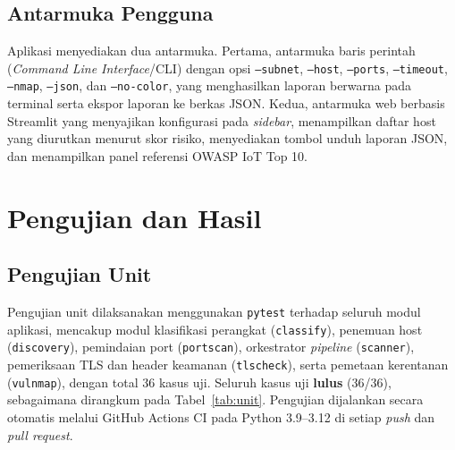 \subsection{Antarmuka Pengguna}
Aplikasi menyediakan dua antarmuka. Pertama, antarmuka baris perintah
(\textit{Command Line Interface}/CLI) dengan opsi \texttt{--subnet},
\texttt{--host}, \texttt{--ports}, \texttt{--timeout}, \texttt{--nmap},
\texttt{--json}, dan \texttt{--no-color}, yang menghasilkan laporan
berwarna pada terminal serta ekspor laporan ke berkas JSON. Kedua,
antarmuka web berbasis Streamlit yang menyajikan konfigurasi pada
\textit{sidebar}, menampilkan daftar host yang diurutkan menurut skor
risiko, menyediakan tombol unduh laporan JSON, dan menampilkan panel
referensi OWASP IoT Top 10.


\section{Pengujian dan Hasil}

\subsection{Pengujian Unit}
Pengujian unit dilaksanakan menggunakan \texttt{pytest} terhadap seluruh modul
aplikasi, mencakup modul klasifikasi perangkat (\texttt{classify}), penemuan
host (\texttt{discovery}), pemindaian port (\texttt{portscan}), orkestrator
\textit{pipeline} (\texttt{scanner}), pemeriksaan TLS dan header keamanan
(\texttt{tlscheck}), serta pemetaan kerentanan (\texttt{vulnmap}), dengan total
36 kasus uji. Seluruh kasus uji \textbf{lulus} (36/36), sebagaimana dirangkum
pada Tabel~\ref{tab:unit}. Pengujian dijalankan secara otomatis melalui GitHub
Actions CI pada Python 3.9--3.12 di setiap \textit{push} dan \textit{pull
request}.

